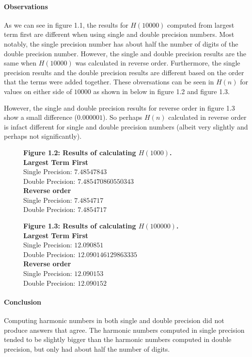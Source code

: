 \documentclass[12pt]{article}
\begin{document}
\paragraph{Observations}
As we can see in figure 1.1, the results for $H(10000)$ computed from largest term first are different when using single and double precision numbers. Most notably, the single precision number has about half the number of digits of the double precision number. However, the single and double precision results are the same when  $H(10000)$ was calculated in reverse order. Furthermore, the single precision results and the double precision results are different based on the order that the terms were added together. These obversations can be seen in $H(n)$ for values on either side of $10000$ as shown in below in figure 1.2 and figure 1.3.

However, the single and double precision results for reverse order in figure 1.3 show a small difference ($0.000001$). So perhaps $H(n)$ calculated in reverse order is infact different for single and double precision numbers (albeit very slightly and perhaps not significantly).


\begin{figure}[h]
\textbf{Figure 1.2: Results of calculating $H(1000)$.}\\
\textbf{Largest Term First}\\
Single Precision: $7.48547843$\\
Double Precision: $7.485470860550343$\\
\textbf{Reverse order}\\
Single Precision: $7.4854717$\\
Double Precision: $7.4854717$
\end{figure}
	
\begin{figure}[h]
	\textbf{Figure 1.3: Results of calculating $H(100000)$.}\\
	\textbf{Largest Term First}\\
	Single Precision: $12.090851$\\
	Double Precision: $12.090146129863335$\\
	\textbf{Reverse order}\\
	Single Precision: $12.090153$\\
	Double Precision: $12.090152$	
\end{figure}	

\paragraph{Conclusion}
Computing harmonic numbers in both single and double precision did not produce answers that agree. The harmonic numbers computed in single precision tended to be slightly bigger than the harmonic numbers computed in double precision, but only had about half the number of digits. 
\end{document}
